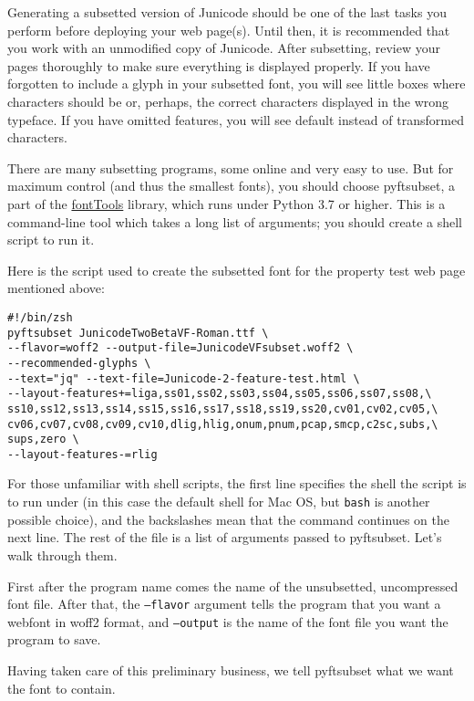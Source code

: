 \documentclass[12pt,letterpaper,openany]{book}
\begin{document}
Generating a subsetted version of Junicode should be one of the last tasks you
perform before deploying your web page(s). Until then, it is recommended that
you work with an unmodified copy of Junicode. After subsetting, review your
pages thoroughly to make sure everything is displayed properly. If you have
forgotten to include a glyph in your subsetted font, you will see little boxes
where characters should be or, perhaps, the correct characters
displayed in the wrong typeface. If you have omitted features, you will see
default instead of transformed characters.

There are many subsetting programs, some online and very easy to use. But for
maximum control (and thus the smallest fonts), you should choose pyftsubset, a
part of the \href{https://github.com/fonttools/fonttools}{fontTools} library,
which runs under Python 3.7 or higher. This is a command-line tool which
takes a long list of arguments; you should create a shell script to run it.

Here is the script used to create the subsetted font for the property test
web page mentioned above:

\small\begin{verbatim}
#!/bin/zsh
pyftsubset JunicodeTwoBetaVF-Roman.ttf \
--flavor=woff2 --output-file=JunicodeVFsubset.woff2 \
--recommended-glyphs \
--text="jq" --text-file=Junicode-2-feature-test.html \
--layout-features+=liga,ss01,ss02,ss03,ss04,ss05,ss06,ss07,ss08,\
ss10,ss12,ss13,ss14,ss15,ss16,ss17,ss18,ss19,ss20,cv01,cv02,cv05,\
cv06,cv07,cv08,cv09,cv10,dlig,hlig,onum,pnum,pcap,smcp,c2sc,subs,\
sups,zero \
--layout-features-=rlig
\end{verbatim}

\normalsize\noindent For those unfamiliar with shell scripts, the first line specifies the shell
the script is to run under (in this case the default shell for Mac OS, but
\texttt{bash} is another possible choice), and the backslashes mean
that the command continues on the next line. The rest of the file is a list
of arguments passed to pyftsubset. Let's walk through them.

First after the program name comes the name of the unsubsetted, uncompressed
font file. After that,
the \texttt{--flavor} argument tells the program that you want a webfont in
woff2 format, and \texttt{--output} is the name of the font file you want the
program to save.

Having taken care of this preliminary business, we tell pyftsubset what we
want the font to contain.
\end{document}
